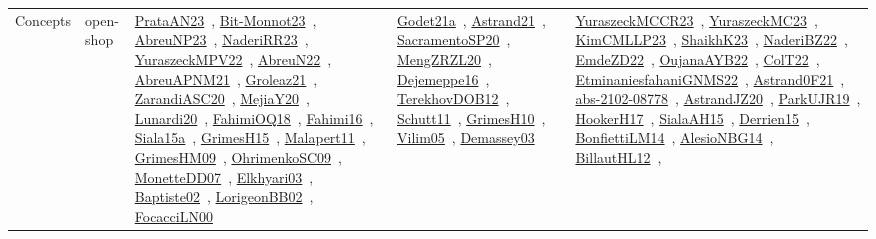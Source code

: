 {\begin{longtable}{lp{3cm}>{\raggedright\arraybackslash}p{6cm}>{\raggedright\arraybackslash}p{6cm}>{\raggedright\arraybackslash}p{8cm}}
Concepts & open-shop & \href{works/PrataAN23.pdf}{PrataAN23}~\cite{PrataAN23}, \href{works/Bit-Monnot23.pdf}{Bit-Monnot23}~\cite{Bit-Monnot23}, \href{works/AbreuNP23.pdf}{AbreuNP23}~\cite{AbreuNP23}, \href{works/NaderiRR23.pdf}{NaderiRR23}~\cite{NaderiRR23}, \href{works/YuraszeckMPV22.pdf}{YuraszeckMPV22}~\cite{YuraszeckMPV22}, \href{works/AbreuN22.pdf}{AbreuN22}~\cite{AbreuN22}, \href{works/AbreuAPNM21.pdf}{AbreuAPNM21}~\cite{AbreuAPNM21}, \href{works/Groleaz21.pdf}{Groleaz21}~\cite{Groleaz21}, \href{works/ZarandiASC20.pdf}{ZarandiASC20}~\cite{ZarandiASC20}, \href{works/MejiaY20.pdf}{MejiaY20}~\cite{MejiaY20}, \href{works/Lunardi20.pdf}{Lunardi20}~\cite{Lunardi20}, \href{works/FahimiOQ18.pdf}{FahimiOQ18}~\cite{FahimiOQ18}, \href{works/Fahimi16.pdf}{Fahimi16}~\cite{Fahimi16}, \href{works/Siala15a.pdf}{Siala15a}~\cite{Siala15a}, \href{works/GrimesH15.pdf}{GrimesH15}~\cite{GrimesH15}, \href{works/Malapert11.pdf}{Malapert11}~\cite{Malapert11}, \href{works/GrimesHM09.pdf}{GrimesHM09}~\cite{GrimesHM09}, \href{works/OhrimenkoSC09.pdf}{OhrimenkoSC09}~\cite{OhrimenkoSC09}, \href{works/MonetteDD07.pdf}{MonetteDD07}~\cite{MonetteDD07}, \href{works/Elkhyari03.pdf}{Elkhyari03}~\cite{Elkhyari03}, \href{works/Baptiste02.pdf}{Baptiste02}~\cite{Baptiste02}, \href{works/LorigeonBB02.pdf}{LorigeonBB02}~\cite{LorigeonBB02}, \href{works/FocacciLN00.pdf}{FocacciLN00}~\cite{FocacciLN00} & \href{works/Godet21a.pdf}{Godet21a}~\cite{Godet21a}, \href{works/Astrand21.pdf}{Astrand21}~\cite{Astrand21}, \href{works/SacramentoSP20.pdf}{SacramentoSP20}~\cite{SacramentoSP20}, \href{works/MengZRZL20.pdf}{MengZRZL20}~\cite{MengZRZL20}, \href{works/Dejemeppe16.pdf}{Dejemeppe16}~\cite{Dejemeppe16}, \href{works/TerekhovDOB12.pdf}{TerekhovDOB12}~\cite{TerekhovDOB12}, \href{works/Schutt11.pdf}{Schutt11}~\cite{Schutt11}, \href{works/GrimesH10.pdf}{GrimesH10}~\cite{GrimesH10}, \href{works/Vilim05.pdf}{Vilim05}~\cite{Vilim05}, \href{works/Demassey03.pdf}{Demassey03}~\cite{Demassey03} & \href{works/YuraszeckMCCR23.pdf}{YuraszeckMCCR23}~\cite{YuraszeckMCCR23}, \href{works/YuraszeckMC23.pdf}{YuraszeckMC23}~\cite{YuraszeckMC23}, \href{works/KimCMLLP23.pdf}{KimCMLLP23}~\cite{KimCMLLP23}, \href{works/ShaikhK23.pdf}{ShaikhK23}~\cite{ShaikhK23}, \href{works/NaderiBZ22.pdf}{NaderiBZ22}~\cite{NaderiBZ22}, \href{works/EmdeZD22.pdf}{EmdeZD22}~\cite{EmdeZD22}, \href{works/OujanaAYB22.pdf}{OujanaAYB22}~\cite{OujanaAYB22}, \href{works/ColT22.pdf}{ColT22}~\cite{ColT22}, \href{works/EtminaniesfahaniGNMS22.pdf}{EtminaniesfahaniGNMS22}~\cite{EtminaniesfahaniGNMS22}, \href{works/Astrand0F21.pdf}{Astrand0F21}~\cite{Astrand0F21}, \href{works/abs-2102-08778.pdf}{abs-2102-08778}~\cite{abs-2102-08778}, \href{works/AstrandJZ20.pdf}{AstrandJZ20}~\cite{AstrandJZ20}, \href{works/ParkUJR19.pdf}{ParkUJR19}~\cite{ParkUJR19}, \href{works/HookerH17.pdf}{HookerH17}~\cite{HookerH17}, \href{works/SialaAH15.pdf}{SialaAH15}~\cite{SialaAH15}, \href{works/Derrien15.pdf}{Derrien15}~\cite{Derrien15}, \href{works/BonfiettiLM14.pdf}{BonfiettiLM14}~\cite{BonfiettiLM14}, \href{works/AlesioNBG14.pdf}{AlesioNBG14}~\cite{AlesioNBG14}, \href{works/BillautHL12.pdf}{BillautHL12}~\cite{BillautHL12}, 
\end{longtable}}

